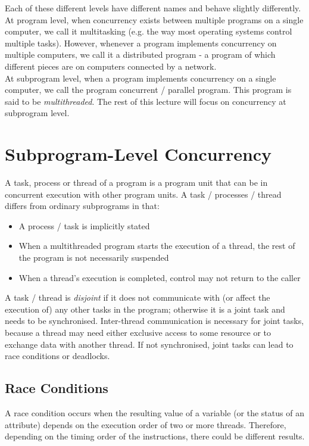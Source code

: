 Each of these different levels have different names and behave slightly differently.\\

At program level, when concurrency exists between multiple programs on a single computer, we call it multitasking (e.g. the way most operating systems control multiple tasks). However, whenever a program implements concurrency on multiple computers, we call it a distributed program - a program of which different pieces are on computers connected by a network.\\

At subprogram level, when a program implements concurrency on a single computer, we call the program concurrent / parallel program. This program is said to be \textit{multithreaded}. The rest of this lecture will focus on concurrency at subprogram level. 

\section{Subprogram-Level Concurrency}
A task, process or thread of a program is a program unit that can be in concurrent execution with other program units. A task / processes / thread differs from ordinary subprograms in that:
\begin{itemize}
    \item A process / task is implicitly stated 
    \item When a multithreaded program starts the execution of a thread, the rest of the program is not necessarily suspended
    \item When a thread's execution is completed, control may not return to the caller
\end{itemize}

A task / thread is \textit{disjoint} if it does not communicate with (or affect the execution of) any other tasks in the program; otherwise it is a joint task and needs to be synchronised. Inter-thread communication is necessary for joint tasks, because a thread may need either exclusive access to some resource or to exchange data with another thread. If not synchronised, joint tasks can lead to race conditions or deadlocks. 

\subsection{Race Conditions}
A race condition occurs when the resulting value of a variable (or the status of an attribute) depends on the execution order of two or more threads. Therefore, depending on the timing order of the instructions, there could be different results. 

